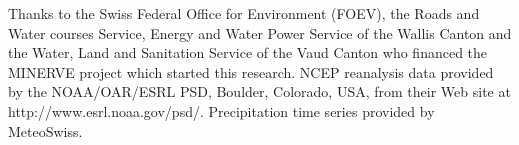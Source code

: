 \documentclass[twocol]{ametsoc}
\begin{document}
Thanks to the Swiss Federal Office for Environment (FOEV), the Roads and Water courses Service, Energy and Water Power Service of the Wallis Canton and the Water, Land and Sanitation Service of the Vaud Canton who financed the MINERVE project which started this research. NCEP reanalysis data provided by the NOAA/OAR/ESRL PSD, Boulder, Colorado, USA, from their Web site at http://www.esrl.noaa.gov/psd/. Precipitation time series provided by MeteoSwiss. 


%






%
%
%
% 
% 
\end{document}
